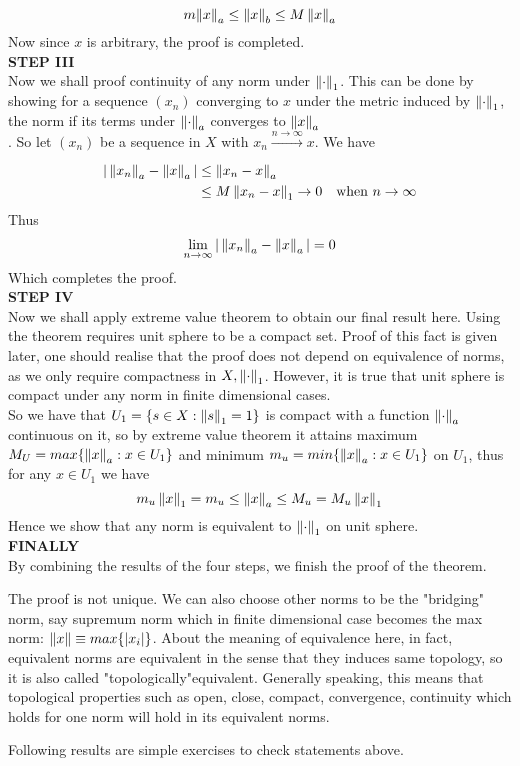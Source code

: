 \begin{theorem}
	$$
		m{\left\|{x}\right\|_a}\leq \left\|{x}\right\|_b\leq M\left\|{x}\right\|_a
	$$
	Now since $x$ is arbitrary, the proof is completed.\\
	{\bf STEP III}\\
	Now we shall proof continuity of any norm under $\left\|{\cdot}\right\| _1$. This can be done by showing for a sequence $(x_n)$ converging to $x$ under the metric induced by $\left\|{\cdot}\right\|_1$, the norm if its terms under $\left\|{\cdot}\right\|_a$ converges to $\left\|{x}\right\|_a$\\. So let $(x_n)$ be a sequence in $X$ with $x_n\xrightarrow[]{n\to \infty}x$. We have
	\begin{equation}
		\begin{split}\nonumber
			|\left\|{x_n}\right\|_a-\left\|{x}\right\|_a|&\leq\left\|{x_n-x}\right\|_a\\
			&\leq M\left\|{x_n-x}\right\|_1\to0\quad \text{when}\,\,n\to\infty
		\end{split}
	\end{equation}
	Thus
	$$
		\lim_{n\to\infty}|\left\|{x_n}\right\|_a-\left\|{x}\right\|_a|=0
	$$
	Which completes the proof.\\
	{\bf STEP IV}\\
	Now we shall apply extreme value theorem to obtain our final result here. Using the theorem requires unit sphere to be a compact set. Proof of this fact is given later, one should realise that the proof does not depend on equivalence of norms, as we only require compactness in $X,\left\|{\cdot}\right\|_1$. However, it is true that unit sphere is compact under any norm in finite dimensional cases.\\
	So we have that $U_1=\{s\in X:\left\|{s}\right\|_1=1\}$ is compact with  a  function $\left\|{\cdot}\right\|_a$ continuous on it, so by extreme value theorem it attains maximum $M_U=max\{\left\|{x}\right\|_a:x\in U_1\}$ and minimum $m_u=min\{\left\|{x}\right\|_a:x\in U_1\}$ on $U_1$, thus for any $x\in U_1$ we have
	$$
		m_u \left\|{x}\right\|_1=m_u\leq\left\|{x}\right\|_a\leq M_u=M_u \left\|{x}\right\|_1
	$$
	Hence we show that any norm is equivalent to $\left\|{\cdot}\right\|_1$ on unit sphere.\\
	{\bf FINALLY}\\
	By combining the results of the four steps, we finish the proof of the theorem.
\end{theorem}

\begin{remark}\rm\nextline
	The proof is not unique. We can also choose other norms to be the "bridging" norm, say supremum norm which in finite dimensional case becomes the max norm: $\left\|{x}\right\|\equiv max\{|x_i|\}$. About the meaning of equivalence here, in fact, equivalent norms are equivalent in the sense that they induces same topology, so it is also called "topologically"equivalent. Generally speaking, this means that topological properties such as open, close, compact, convergence, continuity which holds for one norm will hold in its equivalent norms.
\end{remark}
Following results are simple exercises to check statements above.

